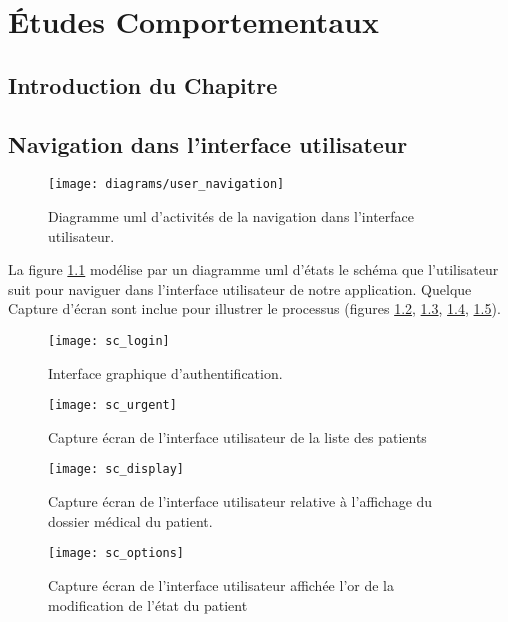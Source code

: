 \chapter{Études Comportementaux}

\section{Introduction du Chapitre}

\section{Navigation dans l'interface utilisateur}

\begin{figure}
\center
\texttt{[image: diagrams/user\_navigation]}
\caption{Diagramme \gls{uml} d'activités de la navigation dans l'interface utilisateur.}
\label{fig:uml_act_ui}
\end{figure}

La figure \ref{fig:uml_act_ui} modélise par un diagramme \gls{uml} d'états le schéma que l'utilisateur suit pour naviguer dans l'interface utilisateur de notre application. Quelque Capture d'écran sont inclue pour illustrer le processus (figures \ref{fig:sc_login}, \ref{fig:sc_urgent}, \ref{fig:sc_display}, \ref{fig:sc_options}).

\begin{figure}
\center
\texttt{[image: sc\_login]}
\caption{Interface graphique d'authentification.}
\label{fig:sc_login}
\end{figure}

\begin{figure}
\center
\texttt{[image: sc\_urgent]}
\caption{Capture écran de l'interface utilisateur de la liste des patients}
\label{fig:sc_urgent}
\end{figure}

\begin{figure}
\center
\texttt{[image: sc\_display]}
\caption{Capture écran de l'interface utilisateur relative à l'affichage du dossier médical du patient.}
\label{fig:sc_display}
\end{figure}

\begin{figure}
\center
\texttt{[image: sc\_options]}
\caption{Capture écran de l'interface utilisateur affichée l'or de la modification de l’état du patient}
\label{fig:sc_options}
\end{figure}


